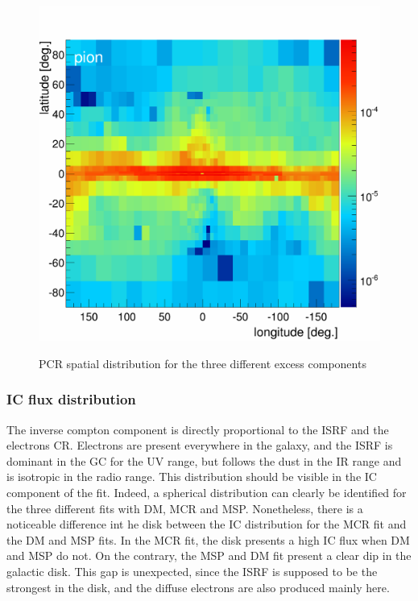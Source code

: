 \begin{figure}[h]
\begin{minipage}[h]{0.3\textwidth}
	  \label{}
  \end{minipage}
  \hfill
  \begin{minipage}[h]{0.3\textwidth}
	  \centering
	  \includegraphics[width=1.\linewidth]{pic/discussion/MSPonly_PCR_integral_flux.png}
	  \label{}
  \end{minipage}
  \caption{PCR spatial distribution for the three different excess components}
  \label{fig:PCR_flux_distrib_excess_comp}	 
\end{figure}



\subsubsection{IC flux distribution}
The inverse compton component is directly proportional to the ISRF and the electrons CR. Electrons are present everywhere in the galaxy, and the ISRF is dominant in the GC for the UV range, but follows the dust in the IR range and is isotropic in the radio range. This distribution should be visible in the IC component of the fit. Indeed, a spherical distribution can clearly be identified for the three different fits with DM, MCR and MSP.
Nonetheless, there is a noticeable difference int he disk between the IC distribution for the MCR fit and the DM and MSP fits. In the MCR fit, the disk presents a high IC flux when DM and MSP do not. On the contrary, the MSP and DM fit present a clear dip in the galactic disk. This gap is unexpected, since the ISRF is supposed to be the strongest in the disk, and the diffuse electrons are also produced mainly here. 

